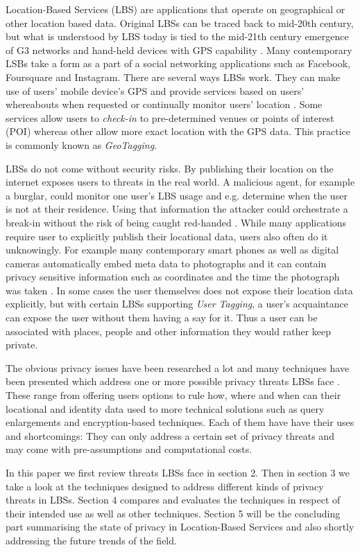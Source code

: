 \documentclass[english]{tktltiki2}
\theoremstyle{definition}
\theoremstyle{remark}
\begin{document}
Location-Based Services (LBS) are applications that operate on geographical or other location based data. Original LBSs can be traced back to mid-20th century, but what is understood by LBS today is tied to the mid-21th century emergence of G3 networks and hand-held devices with GPS capability \cite{History}. Many contemporary LSBs take a form as a part of a social networking applications such as Facebook, Foursquare and Instagram. There are several ways LBSs work. They can make use of users' mobile device's GPS and provide services based on users' whereabouts when requested or continually monitor users' location \cite{LocationPrivacy}. Some services allow users to \textit{check-in} to pre-determined venues or points of interest (POI) whereas other allow more exact location with the GPS data. This practice is commonly known as \textit{GeoTagging}. \par
LBSs do not come without security risks. By publishing their location on the internet exposes users to threats in the real world. A malicious agent, for example a burglar, could monitor one user's LBS usage and e.g. determine when the user is not at their residence. Using that information the attacker could orchestrate a break-in without the risk of being caught red-handed \cite{Friedland2010}. While many applications require user to explicitly publish their locational data, users also often do it unknowingly. For example many contemporary smart phones as well as digital cameras automatically embed meta data to photographs and it can contain privacy sensitive information such as coordinates and the time the photograph was taken \cite{Friedland2010}. In some cases the user themselves does not expose their location data explicitly, but with certain LBSs supporting \textit{User Tagging}, a user's acquaintance can expose the user without them having a say for it. Thus a user can be associated with places, people and other information they would rather keep private. \par
The obvious privacy issues have been researched a lot and many techniques have been presented which address one or more possible privacy threats LBSs face \cite{LocationPrivacy}. These range from offering users options to rule how, where and when can their locational and identity data used to more technical solutions such as query enlargements and encryption-based techniques. Each of them have have their uses and shortcomings: They can only address a certain set of privacy threats and may come with pre-assumptions and computational costs. \par 
In this paper we first review threats LBSs face in section 2. Then in section 3 we take a look at the techniques designed to address different kinds of privacy threats in LBSs. Section 4 compares and evaluates the techniques in respect of their intended use as well as other techniques. Section 5 will be the concluding part summarising the state of privacy in Location-Based Services and also shortly addressing the future trends of the field. 
\end{document}

